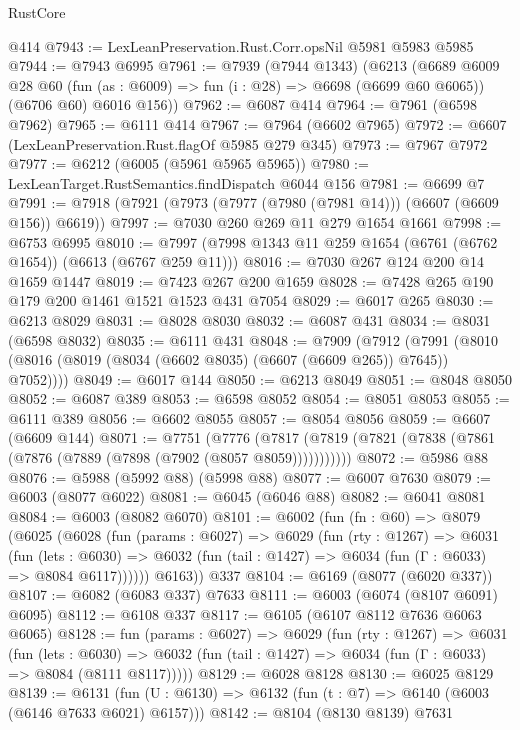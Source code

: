 \begin{lexlean}{RustCore}
\begin{coremodule}
    @414
@7943 := LexLeanPreservation.Rust.Corr.opsNil @5981 @5983 @5985
@7944 := @7943 @6995
@7961 := @7939
    (@7944 @1343)
    (@6213
      (@6689
        @6009
        @28
        @60
        (fun (as : @6009) => fun (i : @28) => @6698 (@6699 @60 @6065))
        (@6706 @60)
        @6016
        @156))
@7962 := @6087 @414
@7964 := @7961 (@6598 @7962)
@7965 := @6111 @414
@7967 := @7964 (@6602 @7965)
@7972 := @6607 (LexLeanPreservation.Rust.flagOf @5985 @279 @345)
@7973 := @7967 @7972
@7977 := @6212 (@6005 (@5961 @5965 @5965))
@7980 := LexLeanTarget.RustSemantics.findDispatch @6044 @156
@7981 := @6699 @7
@7991 := @7918 (@7921 (@7973 (@7977 (@7980 (@7981 @14))) (@6607 (@6609 @156)) @6619))
@7997 := @7030 @260 @269 @11 @279 @1654 @1661
@7998 := @6753 @6995
@8010 := @7997 (@7998 @1343 @11 @259 @1654 (@6761 (@6762 @1654)) (@6613 (@6767 @259 @11)))
@8016 := @7030 @267 @124 @200 @14 @1659 @1447
@8019 := @7423 @267 @200 @1659
@8028 := @7428 @265 @190 @179 @200 @1461 @1521 @1523 @431 @7054
@8029 := @6017 @265
@8030 := @6213 @8029
@8031 := @8028 @8030
@8032 := @6087 @431
@8034 := @8031 (@6598 @8032)
@8035 := @6111 @431
@8048 := @7909
    (@7912 (@7991 (@8010 (@8016 (@8019 (@8034 (@6602 @8035) (@6607 (@6609 @265)) @7645)) @7052))))
@8049 := @6017 @144
@8050 := @6213 @8049
@8051 := @8048 @8050
@8052 := @6087 @389
@8053 := @6598 @8052
@8054 := @8051 @8053
@8055 := @6111 @389
@8056 := @6602 @8055
@8057 := @8054 @8056
@8059 := @6607 (@6609 @144)
@8071 := @7751
    (@7776 (@7817 (@7819 (@7821 (@7838 (@7861 (@7876 (@7889 (@7898 (@7902 (@8057 @8059)))))))))))
@8072 := @5986 @88
@8076 := @5988 (@5992 @88) (@5998 @88)
@8077 := @6007 @7630
@8079 := @6003 (@8077 @6022)
@8081 := @6045 (@6046 @88)
@8082 := @6041 @8081
@8084 := @6003 (@8082 @6070)
@8101 := @6002
    (fun (fn : @60) =>
    @8079
      (@6025
        (@6028
          (fun (params : @6027) =>
          @6029
            (fun (rty : @1267) =>
            @6031
              (fun (lets : @6030) =>
              @6032 (fun (tail : @1427) => @6034 (fun (Γ : @6033) => @8084 @6117))))))
        @6163))
    @337
@8104 := @6169 (@8077 (@6020 @337))
@8107 := @6082 (@6083 @337) @7633
@8111 := @6003 (@6074 (@8107 @6091) @6095)
@8112 := @6108 @337
@8117 := @6105 (@6107 @8112 @7636 @6063 @6065)
@8128 := fun (params : @6027) =>
  @6029
    (fun (rty : @1267) =>
    @6031
      (fun (lets : @6030) =>
      @6032 (fun (tail : @1427) => @6034 (fun (Γ : @6033) => @8084 (@8111 @8117)))))
@8129 := @6028 @8128
@8130 := @6025 @8129
@8139 := @6131 (fun (U : @6130) => @6132 (fun (t : @7) => @6140 (@6003 (@6146 @7633 @6021) @6157)))
@8142 := @8104 (@8130 @8139) @7631

\end{coremodule}
\end{lexlean}
